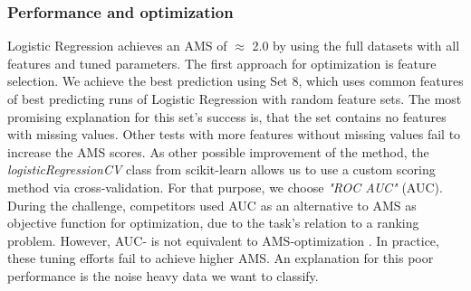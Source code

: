 \subsubsection{Performance and optimization}
Logistic Regression achieves an AMS of $\approx$ 2.0 by using the full datasets with all features and tuned parameters. The first approach for optimization is feature selection. We achieve the best prediction using Set 8, which uses common features of best predicting runs of Logistic Regression with random feature sets. The most promising explanation for this set's success is, that the set contains no features with missing values. Other tests with more features without missing values fail to increase the AMS scores. As other possible improvement of the method, the \emph{logisticRegressionCV} class from scikit-learn allows us to use a custom scoring method via cross-validation. For that purpose, we choose \emph{"ROC AUC"} (AUC). During the challenge, competitors used AUC as an alternative to AMS as objective function for optimization, due to the task's relation to a ranking problem. However, AUC- is not equivalent to AMS-optimization \cite{cowa14}.
In practice, these tuning efforts fail to achieve higher AMS. An explanation for this poor performance is the noise heavy data we want to classify.